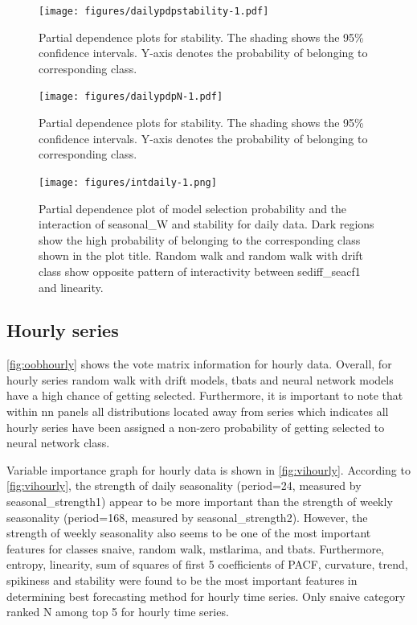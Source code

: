 \documentclass[11pt,a4paper,]{article}
\begin{document}
\begin{figure}
\centering
\texttt{[image: figures/dailypdpstability-1.pdf]}
\caption{\label{fig:dailypdpstability}Partial dependence plots for stability. The shading shows the 95\% confidence intervals. Y-axis denotes the probability of belonging to corresponding class.}
\end{figure}

\begin{figure}
\centering
\texttt{[image: figures/dailypdpN-1.pdf]}
\caption{\label{fig:dailypdpN}Partial dependence plots for stability. The shading shows the 95\% confidence intervals. Y-axis denotes the probability of belonging to corresponding class.}
\end{figure}

\begin{figure}
\centering
\texttt{[image: figures/intdaily-1.png]}
\caption{\label{fig:intdaily}Partial dependence plot of model selection probability and the interaction of seasonal\_W and stability for daily data. Dark regions show the high probability of belonging to the corresponding class shown in the plot title. Random walk and random walk with drift class show opposite pattern of interactivity between sediff\_seacf1 and linearity.}
\end{figure}

\hypertarget{hourly-series}{%
\subsection{Hourly series}\label{hourly-series}}

\autoref{fig:oobhourly} shows the vote matrix information for hourly data. Overall, for hourly series random walk with drift models, tbats and neural network models have a high chance of getting selected. Furthermore, it is important to note that within nn panels all distributions located away from series which indicates all hourly series have been assigned a non-zero probability of getting selected to neural network class.

Variable importance graph for hourly data is shown in \autoref{fig:vihourly}. According to \autoref{fig:vihourly}, the strength of daily seasonality (period=24, measured by seasonal\_strength1) appear to be more important than the strength of weekly seasonality (period=168, measured by seasonal\_strength2). However, the strength of weekly seasonality also seems to be one of the most important features for classes snaive, random walk, mstlarima, and tbats. Furthermore, entropy, linearity, sum of squares of first 5 coefficients of PACF, curvature, trend, spikiness and stability were found to be the most important features in determining best forecasting method for hourly time series. Only snaive category ranked N among top 5 for hourly time series.
\end{document}
